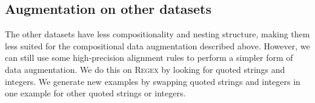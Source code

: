 \documentclass[11pt,letterpaper]{article}
\newcommand{\atis}{\textsc{ATIS}\xspace}
\newcommand{\regex}{\textsc{Regex}\xspace}
\newcommand{\catroot}{\textsc{Root}\xspace}
\newcommand{\catquotstr}{\textsc{Str}\xspace}
\newcommand{\catint}{\textsc{Int}\xspace}
\newcommand\pl[1]{\textcolor{red}{[PL: #1]}}
\newcommand\rj[1]{\textcolor{blue}{[RJ: #1]}}
\begin{document}
\subsection{Augmentation on other datasets}
%
%
%
%
%
%
%
%
%
%
%
The other datasets have
less compositionality and nesting structure,
making them less suited for the compositional data augmentation
described above.
However, we can still use some high-precision alignment rules
to perform a simpler form of data augmentation.
We do this on \regex by looking for quoted strings and integers.
We generate new examples by
swapping quoted strings and integers in one example
for other quoted strings or integers.
\end{document}
